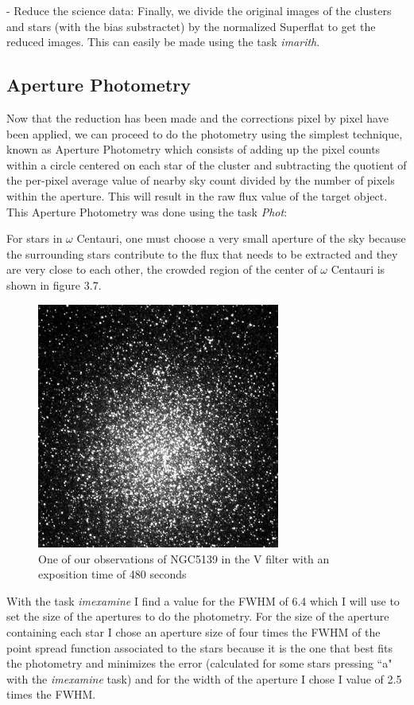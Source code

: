 - Reduce the science data: Finally, we divide the original images of the clusters and stars (with the bias substractet) by the normalized Superflat to get the reduced images. This can easily be made using the task \textit{imarith}.

\subsection{Aperture Photometry}

Now that the reduction has been made and the corrections pixel by pixel have been applied, we can proceed to do the photometry using the simplest technique, known as Aperture Photometry which consists of adding up the pixel counts within a circle centered on each star of the cluster and subtracting the quotient of the per-pixel average value of nearby sky count divided by the number of pixels within the aperture. This will result in the raw flux value of the target object. This Aperture Photometry was done using the task \textit{Phot}:

For stars in $\omega$ Centauri, one must choose a very small aperture of the sky because the surrounding stars contribute to the flux that needs to be extracted and they are very close to each other, the crowded region of the center of $\omega$ Centauri is shown in figure 3.7. 

\begin{figure}[H]
\centering
\includegraphics[width=8cm]{images/NGC5139_red.png}
\caption[NGC5139 as observed in the V filter]{One of our observations of NGC5139 in the V filter with an exposition time of 480 seconds}
\end{figure}

With the task \textit{imexamine} I find a value for the FWHM of 6.4 which I will use to set the size of the apertures to do the photometry. For the size of the aperture containing each star I chose an aperture size of four times the FWHM of the point spread function associated to the stars because it is the one that best fits the photometry and minimizes the error (calculated for some stars pressing ``a" with the \textit{imexamine} task) and for the width of the aperture I chose I value of 2.5 times the FWHM.

